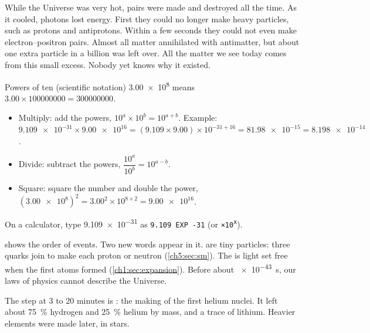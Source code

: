 While the Universe was very hot, pairs were made and destroyed all the time. As it
cooled, photons lost energy. First they could no longer make heavy particles, such as
protons and antiprotons. Within a few seconds they could not even make
electron--positron pairs. Almost all matter annihilated
with antimatter, but about one extra particle in a billion was left over. All the
matter we see today comes from this small excess. Nobody yet knows why it existed.

\begin{toolkit}{Powers of ten (scientific notation)}
\num{3.00e8} means $3.00 \times \num{100000000} = \num{300000000}$.
\begin{itemize}
  \item Multiply: add the powers, $10^a \times 10^b = 10^{a+b}$. Example:
        $\num{9.109e-31} \times \num{9.00e16} = (9.109 \times 9.00) \times 10^{-31+16}
        = \num{81.98e-15} = \num{8.198e-14}$.
  \item Divide: subtract the powers, $\dfrac{10^a}{10^b} = 10^{a-b}$.
  \item Square: square the number and double the power,
        $(\num{3.00e8})^2 = 3.00^2 \times 10^{8 \times 2} = \num{9.00e16}$.
\end{itemize}
On a calculator, type \num{9.109e-31} as \texttt{9.109 EXP -31} (or \texttt{×10\textsuperscript{x}}).
\end{toolkit}

 shows the order of events. Two new words appear in it.
 are tiny particles: three quarks join to make each proton or neutron
(\cref{ch5:sec:sm}). The  is light set free when the first atoms formed
(\cref{ch1:sec:expansion}). Before about \qty{e-43}{s}, our laws of physics cannot
describe the Universe.

The step at 3 to 20 minutes is : the making of the first
helium nuclei. It left about \qty{75}{\percent} hydrogen and \qty{25}{\percent} helium by
mass, and a trace of lithium. Heavier elements were made later, in stars.

